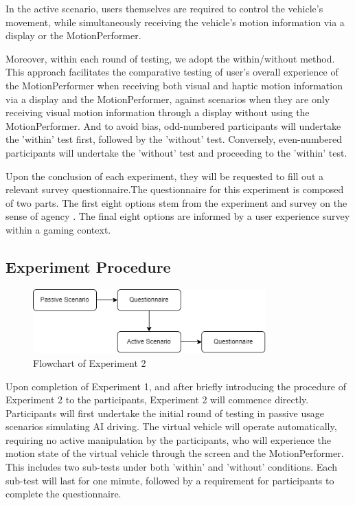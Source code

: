 In the active scenario, users themselves are required to control the vehicle's movement, while simultaneously receiving the vehicle's motion information via a display or the MotionPerformer.

Moreover, within each round of testing, we adopt the within/without method. This approach facilitates the comparative testing of user's overall experience of the MotionPerformer when receiving both visual and haptic motion information via a display and the MotionPerformer, against scenarios when they are only receiving visual motion information through a display without using the MotionPerformer. 
And to avoid bias, odd-numbered participants will undertake the 'within' test first, followed by the 'without' test. Conversely, even-numbered participants will undertake the 'without' test and proceeding to the 'within' test.

Upon the conclusion of each experiment, they will be requested to fill out a relevant survey questionnaire.The questionnaire for this experiment is composed of two parts. The first eight options stem from the experiment and survey on the sense of agency \cite{paper38} . The final eight options are informed by a user experience survey within a gaming context\cite{paper39}.

\subsection{Experiment Procedure}

\begin{figure}[h]
\centering
\includegraphics[width=0.8\textwidth]{A_thesis/figures/042.png}
\caption{Flowchart of Experiment 2}
\end{figure}

Upon completion of Experiment 1, and after briefly introducing the procedure of Experiment 2 to the participants, Experiment 2 will commence directly. Participants will first undertake the initial round of testing in passive usage scenarios simulating AI driving. The virtual vehicle will operate automatically, requiring no active manipulation by the participants, who will experience the motion state of the virtual vehicle through the screen and the MotionPerformer. This includes two sub-tests under both 'within' and 'without' conditions. Each sub-test will last for one minute, followed by a requirement for participants to complete the questionnaire.

